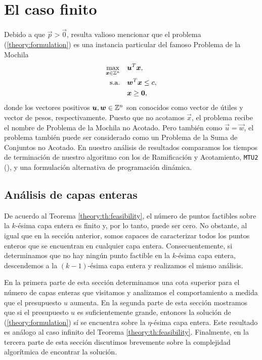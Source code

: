 \chapter{El caso finito}
\noindent
Debido a que $\vec{p} > \vec{0}$, resulta valioso mencionar que el problema
(\ref{theory:formulation}) es una instancia particular del famoso Problema de la Mochila
\begin{subequations}
	\label{knapsack-formulation}
	\begin{align}
		\max_{\boldsymbol{x} \in \mathbb{Z}^n} \quad
			& \boldsymbol{u}^T\boldsymbol{x}, \\
		\text{s.a.} \quad
			& \boldsymbol{w}^T\boldsymbol{x} \leq c, \\
			& \boldsymbol{x} \geq \boldsymbol{0},
	\end{align}
\end{subequations}
donde los vectores positivos $\boldsymbol{u}, \boldsymbol{w} \in \mathbb{Z}^n$ son conocidos como vector de útiles y
vector de pesos, respectivamente. Puesto que no acotamos $\vec{x}$, el problema recibe el nombre de
Problema de la Mochila no Acotado. Pero también como $\vec{u} = \vec{w}$, el problema
también puede ser considerado como un Problema de la Suma de Conjuntos no Acotado. En nuestro análisis
de resultados comparamos los tiempos de terminación de nuestro algoritmo con los de Ramificación y
Acotamiento, \texttt{MTU2} (\cite{martello}), y una formulación alternativa de programación dinámica.

\section{Análisis de capas enteras}
\noindent
De acuerdo al Teorema \ref{theory:th:feasibility}, el número de puntos factibles sobre la
$k$-ésima capa entera es finito y, por lo tanto, puede ser cero. No obstante, al igual que en la
sección anterior, somos capaces de caracterizar todos los puntos enteros que se encuentran en
cualquier capa entera. Consecuentemente, si determinamos que no hay ningún punto factible en la
$k$-ésima capa entera, descendemos a la $(k -1)$-ésima capa entera y realizamos el mismo
análisis.

En la primera parte de esta sección determinamos una cota superior para el número de capas enteras
que visitamos y analizamos el comportamiento a medida que el presupuesto $u$ aumenta. En la segunda
parte de esta sección mostramos que si el presupuesto $u$ es suficientemente grande, entonces la
solución de (\ref{theory:formulation}) sí se encuentra sobre la $\eta$-ésima capa entera. Este
resultado es análogo al caso infinito del Teorema \ref{theory:th:feasibility}. Finalmente, en la
tercera parte de esta sección discutimos brevemente sobre la complejidad algorítmica de encontrar
la solución.

